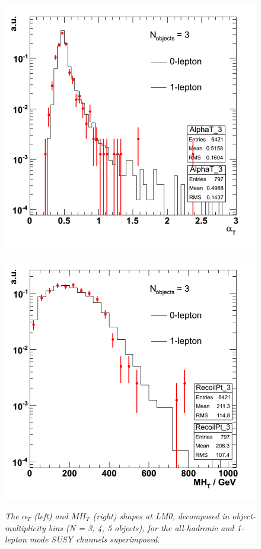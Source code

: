\begin{figure}[h!]
\begin{minipage}[b]{0.5\linewidth}
\centering
{\label{fig:lm1_cor}\includegraphics[scale=0.36]{./plots/aT_njet.png}}
\end{minipage}
\begin{minipage}[b]{0.5\linewidth}
\centering
{\label{fig:qcd_cor}\includegraphics[scale=0.36]{./plots/recoil_njet.png}}
\end{minipage}
\caption{\textit{The $\alpha_{T}$ (left) and $MH_{T}$ (right) shapes at LM0, decomposed in object-multiplicity bins (N = 3, 4, 5 objects), for the all-hadronic and 1-lepton mode SUSY channels superimposed. }}
\label{fig:kin}
\end{figure}


